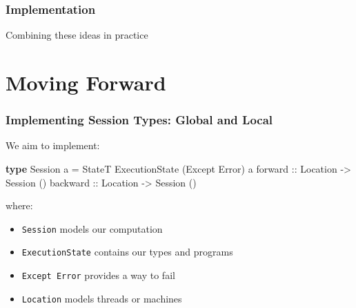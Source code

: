 \documentclass[12pt]{beamer}
\newenvironment{Shaded}{}{}
\newcommand{\KeywordTok}[1]{\textcolor[rgb]{0.00,0.44,0.13}{\textbf{#1}}}
\newcommand{\DataTypeTok}[1]{\textcolor[rgb]{0.56,0.13,0.00}{#1}}
\newcommand{\OtherTok}[1]{\textcolor[rgb]{0.00,0.44,0.13}{#1}}
\newcommand{\FunctionTok}[1]{\textcolor[rgb]{0.02,0.16,0.49}{#1}}
\newcommand{\NormalTok}[1]{#1}
\begin{document}
\begin{frame}[fragile]
\frametitle{Implementation}

\begin{center}
    \Large{Combining these ideas in practice}
\end{center}
\end{frame}


\section{Moving Forward}



\begin{frame}[fragile]
\frametitle{Implementing Session Types: Global and Local}

We aim to implement: 
\begin{Shaded}
\begin{Highlighting}[]
\KeywordTok{type} \DataTypeTok{Session} \NormalTok{a }\FunctionTok{=} \DataTypeTok{StateT} \DataTypeTok{ExecutionState} \NormalTok{(}\DataTypeTok{Except} \DataTypeTok{Error}\NormalTok{) a}
\OtherTok{forward  ::} \DataTypeTok{Location} \OtherTok{->} \DataTypeTok{Session} \NormalTok{()}
\OtherTok{backward ::} \DataTypeTok{Location} \OtherTok{->} \DataTypeTok{Session} \NormalTok{()}
\end{Highlighting}
\end{Shaded}

where:
\begin{itemize}
    \item \texttt{Session} models our computation
    \item \texttt{ExecutionState} contains our types and programs 
    \item \texttt{Except Error} provides a way to fail
    \item \texttt{Location} models threads or machines 
\end{itemize}




\end{frame}
\end{document}
